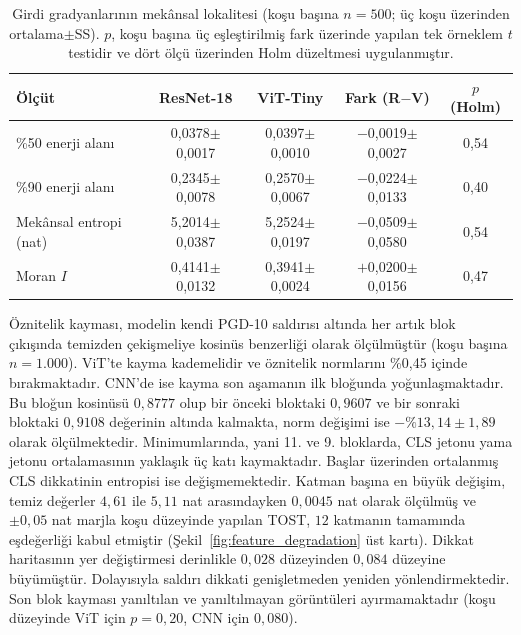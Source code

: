 \begin{table}[!t]
\centering
\caption{Girdi gradyanlarının mekânsal lokalitesi (koşu başına $n=500$; üç koşu üzerinden ortalama$\pm$SS). $p$, koşu başına üç eşleştirilmiş fark üzerinde yapılan tek örneklem $t$ testidir ve dört ölçü üzerinden Holm düzeltmesi uygulanmıştır.}
\label{tab:spatial}
\scriptsize
\setlength{\tabcolsep}{1.6pt}
\begin{tabular}{lcccc}
\toprule
\textbf{Ölçüt} & \textbf{ResNet-18} & \textbf{ViT-Tiny} & \textbf{Fark (R$-$V)} & \textbf{$p$ (Holm)} \\
\midrule
\%50 enerji alanı & 0,0378$\pm$0,0017 & 0,0397$\pm$0,0010 & $-$0,0019$\pm$0,0027 & 0,54 \\
\%90 enerji alanı & 0,2345$\pm$0,0078 & 0,2570$\pm$0,0067 & $-$0,0224$\pm$0,0133 & 0,40 \\
Mekânsal entropi (nat) & 5,2014$\pm$0,0387 & 5,2524$\pm$0,0197 & $-$0,0509$\pm$0,0580 & 0,54 \\
Moran $I$ & 0,4141$\pm$0,0132 & 0,3941$\pm$0,0024 & $+$0,0200$\pm$0,0156 & 0,47 \\
\bottomrule
\end{tabular}
\end{table}

Öznitelik kayması, modelin kendi PGD-10 saldırısı altında her artık blok çıkışında temizden çekişmeliye kosinüs benzerliği olarak ölçülmüştür (koşu başına $n = 1.000$). ViT'te kayma kademelidir ve öznitelik normlarını \%0,45 içinde bırakmaktadır. CNN'de ise kayma son aşamanın ilk bloğunda yoğunlaşmaktadır. Bu bloğun kosinüsü $0{,}8777$ olup bir önceki bloktaki $0{,}9607$ ve bir sonraki bloktaki $0{,}9108$ değerinin altında kalmakta, norm değişimi ise $-\%13{,}14\pm1{,}89$ olarak ölçülmektedir. Minimumlarında, yani 11. ve 9. bloklarda, CLS jetonu yama jetonu ortalamasının yaklaşık üç katı kaymaktadır. Başlar üzerinden ortalanmış CLS dikkatinin entropisi ise değişmemektedir. Katman başına en büyük değişim, temiz değerler $4{,}61$ ile $5{,}11$ nat arasındayken $0{,}0045$ nat olarak ölçülmüş ve $\pm0{,}05$ nat marjla koşu düzeyinde yapılan TOST, $12$ katmanın tamamında eşdeğerliği kabul etmiştir (Şekil~\ref{fig:feature_degradation} üst kartı). Dikkat haritasının yer değiştirmesi derinlikle $0{,}028$ düzeyinden $0{,}084$ düzeyine büyümüştür. Dolayısıyla saldırı dikkati genişletmeden yeniden yönlendirmektedir. Son blok kayması yanıltılan ve yanıltılmayan görüntüleri ayırmamaktadır (koşu düzeyinde ViT için $p = 0{,}20$, CNN için $0{,}080$).

